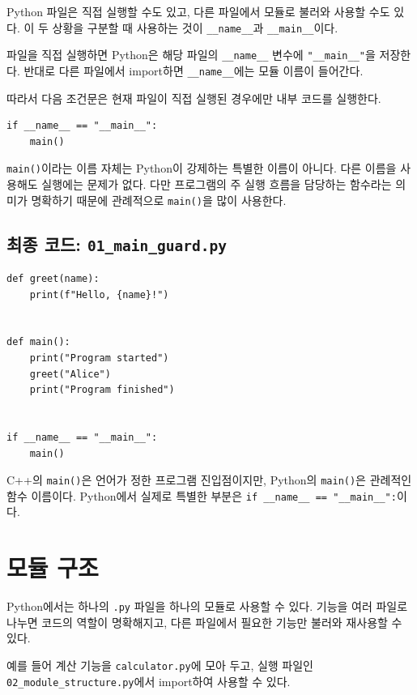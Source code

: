 \documentclass[11pt,a4paper]{article}
\begin{document}
Python 파일은 직접 실행할 수도 있고, 다른 파일에서 모듈로 불러와 사용할 수도 있다. 이 두 상황을 구분할 때 사용하는 것이 \texttt{\_\_name\_\_}과 \texttt{\_\_main\_\_}이다.

파일을 직접 실행하면 Python은 해당 파일의 \texttt{\_\_name\_\_} 변수에 \texttt{"\_\_main\_\_"}을 저장한다. 반대로 다른 파일에서 import하면 \texttt{\_\_name\_\_}에는 모듈 이름이 들어간다.

따라서 다음 조건문은 현재 파일이 직접 실행된 경우에만 내부 코드를 실행한다.

\begin{lstlisting}
if __name__ == "__main__":
    main()
\end{lstlisting}

\texttt{main()}이라는 이름 자체는 Python이 강제하는 특별한 이름이 아니다. 다른 이름을 사용해도 실행에는 문제가 없다. 다만 프로그램의 주 실행 흐름을 담당하는 함수라는 의미가 명확하기 때문에 관례적으로 \texttt{main()}을 많이 사용한다.

\subsection{최종 코드: \texttt{01\_main\_guard.py}}

\begin{lstlisting}
def greet(name):
    print(f"Hello, {name}!")


def main():
    print("Program started")
    greet("Alice")
    print("Program finished")


if __name__ == "__main__":
    main()
\end{lstlisting}

\begin{importantbox}
C++의 \texttt{main()}은 언어가 정한 프로그램 진입점이지만, Python의 \texttt{main()}은 관례적인 함수 이름이다. Python에서 실제로 특별한 부분은 \texttt{if \_\_name\_\_ == "\_\_main\_\_":}이다.
\end{importantbox}

\section{모듈 구조}

Python에서는 하나의 \texttt{.py} 파일을 하나의 모듈로 사용할 수 있다. 기능을 여러 파일로 나누면 코드의 역할이 명확해지고, 다른 파일에서 필요한 기능만 불러와 재사용할 수 있다.

예를 들어 계산 기능을 \texttt{calculator.py}에 모아 두고, 실행 파일인 \texttt{02\_module\_structure.py}에서 import하여 사용할 수 있다.
\end{document}
